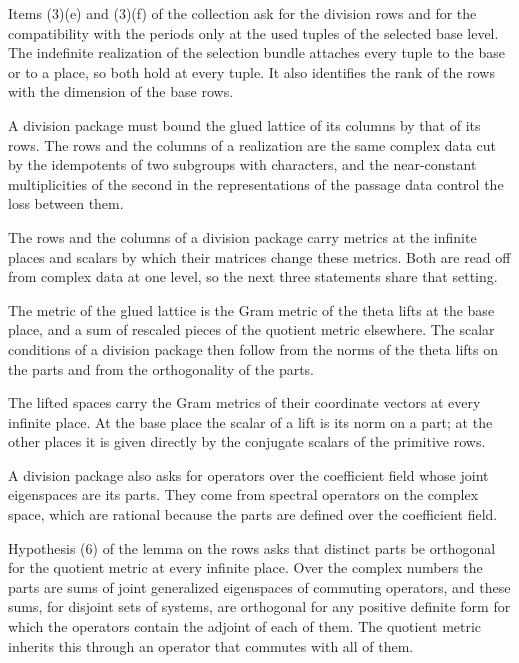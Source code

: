 Items (3)(e) and (3)(f) of the collection ask for the division rows and for
the compatibility with the periods only at the used tuples of the selected
base level. The indefinite realization of the selection bundle attaches every
tuple to the base or to a place, so both hold at every tuple. It also
identifies the rank of the rows with the dimension of the base rows.

A division package must bound the glued lattice of its columns by that of its
rows. The rows and the columns of a realization are the same complex data cut
by the idempotents of two subgroups with characters, and the near-constant
multiplicities of the second in the representations of the passage data
control the loss between them.

The rows and the columns of a division package carry metrics at the infinite places and scalars
by which their matrices change these metrics. Both are read off from complex data at one level, so
the next three statements share that setting.

The metric of the glued lattice is the Gram metric of the theta lifts at the base place, and a sum
of rescaled pieces of the quotient metric elsewhere. The scalar conditions of a division package
then follow from the norms of the theta lifts on the parts and from the orthogonality of the parts.

The lifted spaces carry the Gram metrics of their coordinate vectors at every infinite place. At the
base place the scalar of a lift is its norm on a part; at the other places it is given directly by
the conjugate scalars of the primitive rows.

A division package also asks for operators over the coefficient field whose joint eigenspaces are
its parts. They come from spectral operators on the complex space, which are rational because the
parts are defined over the coefficient field.

Hypothesis (6) of the lemma on the rows asks that distinct parts be orthogonal for the quotient
metric at every infinite place. Over the complex numbers the parts are sums of joint generalized
eigenspaces of commuting operators, and these sums, for disjoint sets of systems, are orthogonal for
any positive definite form for which the operators contain the adjoint of each of them. The quotient
metric inherits this through an operator that commutes with all of them.

